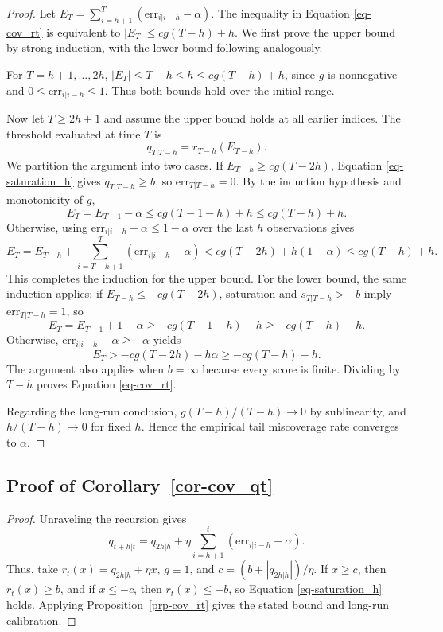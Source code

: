 \documentclass[
  american,
  12pt]{article}
\theoremstyle{plain}
\theoremstyle{plain}
\theoremstyle{remark}
\begin{document}
\begin{proof}
Let \(E_T=\sum_{i=h+1}^{T}(\mathrm{err}_{i|i-h}-\alpha)\). The
inequality in Equation \eqref{eq-cov_rt} is equivalent to
\(|E_T|\leq cg(T-h)+h\). We first prove the upper bound by strong
induction, with the lower bound following analogously.

For \(T=h+1,\dots,2h\), \(|E_T|\leq T-h\leq h\leq cg(T-h)+h\), since
\(g\) is nonnegative and \(0\leq\mathrm{err}_{i|i-h}\leq1\). Thus both
bounds hold over the initial range.

Now let \(T\geq2h+1\) and assume the upper bound holds at all earlier
indices. The threshold evaluated at time \(T\) is \[
q_{T|T-h}=r_{T-h}(E_{T-h}).
\] We partition the argument into two cases. If
\(E_{T-h}\geq cg(T-2h)\), Equation \eqref{eq-saturation_h} gives
\(q_{T|T-h}\geq b\), so \(\mathrm{err}_{T|T-h}=0\). By the induction
hypothesis and monotonicity of \(g\), \[
E_T=E_{T-1}-\alpha\leq cg(T-1-h)+h\leq cg(T-h)+h.
\] Otherwise, using \(\mathrm{err}_{i|i-h}-\alpha\leq1-\alpha\) over the
last \(h\) observations gives \[
E_T=E_{T-h}+\sum_{i=T-h+1}^{T}(\mathrm{err}_{i|i-h}-\alpha)
<cg(T-2h)+h(1-\alpha)\leq cg(T-h)+h.
\] This completes the induction for the upper bound. For the lower
bound, the same induction applies: if \(E_{T-h}\leq-cg(T-2h)\),
saturation and \(s_{T|T-h}>-b\) imply \(\mathrm{err}_{T|T-h}=1\), so \[
E_T=E_{T-1}+1-\alpha\geq-cg(T-1-h)-h\geq-cg(T-h)-h.
\] Otherwise, \(\mathrm{err}_{i|i-h}-\alpha\geq-\alpha\) yields \[
E_T>-cg(T-2h)-h\alpha\geq-cg(T-h)-h.
\] The argument also applies when \(b=\infty\) because every score is
finite. Dividing by \(T-h\) proves Equation \eqref{eq-cov_rt}.

Regarding the long-run conclusion, \(g(T-h)/(T-h)\to0\) by sublinearity,
and \(h/(T-h)\to0\) for fixed \(h\). Hence the empirical tail
miscoverage rate converges to \(\alpha\).
\end{proof}

\subsection{\texorpdfstring{Proof of
Corollary~\ref{cor-cov_qt}}{Proof of Corollary~}}\label{sec-proof_cov_qt}

\begin{proof}
Unraveling the recursion gives \[
q_{t+h|t}=q_{2h|h}+\eta\sum_{i=h+1}^{t}(\mathrm{err}_{i|i-h}-\alpha).
\] Thus, take \(r_t(x)=q_{2h|h}+\eta x\), \(g\equiv1\), and
\(c=(b+|q_{2h|h}|)/\eta\). If \(x\geq c\), then \(r_t(x)\geq b\), and if
\(x\leq-c\), then \(r_t(x)\leq-b\), so Equation \eqref{eq-saturation_h}
holds. Applying Proposition~\ref{prp-cov_rt} gives the stated bound and
long-run calibration.
\end{proof}
\end{document}
